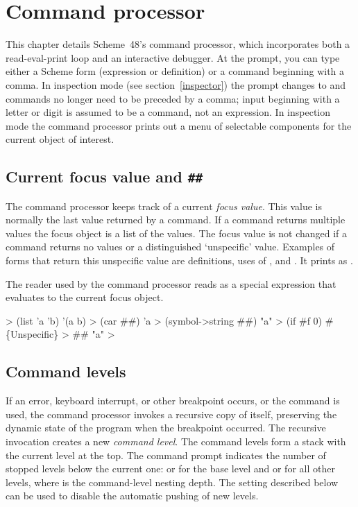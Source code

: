 

\chapter{Command processor}
\label{chapter:command-processor}

This chapter details Scheme~48's command processor, which incorporates
 both a read-eval-print loop and an interactive debugger.
At the \code{>} prompt, you can type either a Scheme form
 (expression or definition) or a command beginning with a comma.
In
inspection mode (see section~\ref{inspector})
 the prompt changes to \code{:} and commands
 no longer need to be preceded by a comma; input beginning with
 a letter or digit is assumed to be a command, not an expression.
In inspection mode the command processor prints out a
 menu of selectable components for the current object of interest.

\section{Current focus value and {\tt \#\#}}

The command processor keeps track of a current {\em focus value}.
This value is normally the last value returned by a command.
If a command returns multiple values the focus object is a list of the
 values.
The focus value is not changed if a command returns no values or 
 a distinguished `unspecific' value.
Examples of forms that return this unspecific value are definitions,
 uses of , and .
It prints as .

The reader used by the command processor reads \code{\#\#} as a special
 expression that evaluates to the current focus object.
\begin{example}
> (list 'a 'b)
'(a b)
> (car ##)
'a
> (symbol->string ##)
"a"
> (if #f 0)
#\{Unspecific\}
> ##
"a"
> 
\end{example}

\section{Command levels}

If an error, keyboard interrupt, or other breakpoint occurs, or the
  command is used, the command
 processor invokes a recursive copy of itself, preserving the dynamic state of
 the program when the breakpoint occurred.
The recursive invocation creates a new {\em command level}.
The command levels form a stack with the current level at the top.
The command prompt indicates the number of stopped levels below the
 current one: \code{>} or \code{:} for the
 base level and  or  for all other levels,
 where  is the command-level nesting depth.
The  setting
 described below can be used to disable the automatic pushing of new levels.

